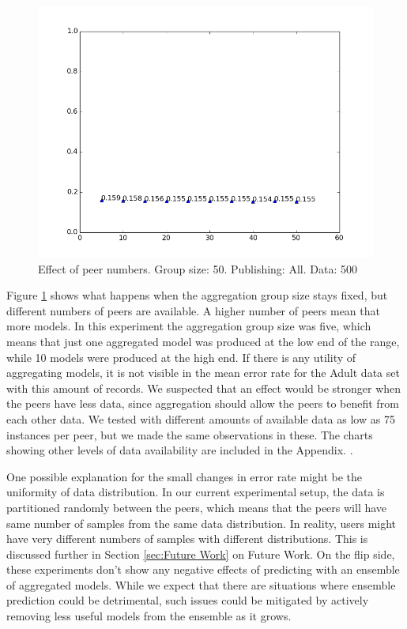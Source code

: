 \begin{figure}[H]
	\centering
	\includegraphics[width=\textwidth]{fig/adult/eps1.0,budg=eps,peers5-55,groups5,reg2e2-data500-pubAll-adult-groupbypeerverification-3-testsetmean}
	\caption{Effect of peer numbers. Group size: 50. Publishing: All. Data: 500}
	\label{fig:peer_range_constant_group}
\end{figure}

Figure \ref{fig:peer_range_constant_group} shows what happens when the aggregation group size stays fixed, but different numbers of peers are available. A higher number of peers mean that more models. In this experiment the aggregation group size was five, which means that just one aggregated model was produced at the low end of the range, while 10 models were produced at the high end. If there is any utility of aggregating models, it is not visible in the mean error rate for the Adult data set with this amount of records. We suspected that an effect would be stronger when the peers have less data, since aggregation should allow the peers to benefit from each other data. We tested with different amounts of available data as low as 75 instances per peer, but we made the same observations in these. The charts showing other levels of data availability are included in the Appendix.  .

One possible explanation for the small changes in error rate might be the uniformity of data distribution. In our current experimental setup, the data is partitioned randomly between the peers, which means that the peers will have same number of samples from the same data distribution. In reality, users might have very different numbers of samples with different distributions. This is discussed further in Section \ref{sec:Future Work} on Future Work. On the flip side, these experiments don't show any negative effects of predicting with an ensemble of aggregated models. While we expect that there are situations where ensemble prediction could be detrimental, such issues could be mitigated by actively removing less useful models from the ensemble as it grows.

